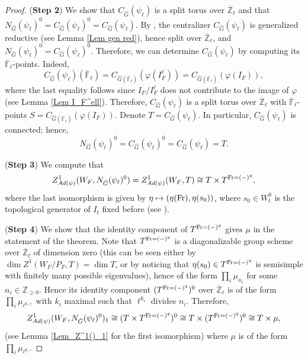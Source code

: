 \begin{theorem}
\begin{proof}
    	(\textbf{Step 2}) We show that $C_{\hat{G}}(\psi_{\ell})$ is a split torus over $\overline{\mathbb{Z}}_{\ell}$ and that $N_{\hat{G}}(\psi_{\ell})^0=C_{\hat{G}}(\psi_{\ell})^0=C_{\hat{G}}(\psi_{\ell})$. By \cite[Subsection 3.1]{dat2022ihes}, the centralizer $C_{\hat{G}}(\psi_{\ell})$ is generalized reductive (see Lemma \ref{Lem gen red}), hence split over $\overline{\mathbb{Z}}_{\ell}$, and $N_{\hat{G}}(\psi_{\ell})^0=C_{\hat{G}}(\psi_{\ell})^0$. Therefore, we can determine $C_{\hat{G}}(\psi_{\ell})$ by computing its $\overline{\mathbb{F}}_{\ell}$-points. Indeed,
    	$$C_{\hat{G}}(\psi_{\ell})(\overline{\mathbb{F}}_{\ell})=C_{\hat{G}(\overline{\mathbb{F}}_{\ell})}(\varphi(I_F^\ell))=C_{\hat{G}(\overline{\mathbb{F}}_{\ell})}(\varphi(I_F)),$$
    	where the last equality follows since $I_F/I_F^{\ell}$ does not contribute to the image of $\varphi$ (see Lemma \ref{Lem I_F^ell}). Therefore, $C_{\hat{G}}(\psi_{\ell})$ is a split torus over $\overline{\mathbb{Z}}_{\ell}$ with $\overline{\mathbb{F}}_{\ell}$-points $S=C_{\hat{G}(\overline{\mathbb{F}}_{\ell})}(\varphi(I_F))$. Denote $T=C_{\hat{G}}(\psi_{\ell})$. In particular, $C_{\hat{G}}(\psi_{\ell})$  is connected; hence, 
    	\begin{equation}\label{Equation: T}
    	N_{\hat{G}}(\psi_{\ell})^0=C_{\hat{G}}(\psi_{\ell})^0=C_{\hat{G}}(\psi_{\ell})=T.
    	\end{equation}
    	
    	
    	(\textbf{Step 3}) We compute that
    	$$Z^1_{Ad(\psi)}(W_F, N_{\hat{G}}(\psi_{\ell})^0)=Z^1_{Ad(\psi)}(W_F, T) \cong T \times T^{\operatorname{Fr}=(-)^q},$$
    	where the last isomorphism is given by $\eta \mapsto (\eta(\operatorname{Fr}), \eta(s_0))$, where $s_0 \in W_t^0$ is the topological generator of $I_t$ fixed before (see \cite[Example 3.14]{dat2022ihes}).
    	
    	(\textbf{Step 4}) We show that the identity component of $T^{\operatorname{Fr}=(-)^q}$ gives $\mu$ in the statement of the theorem. Note that $T^{\operatorname{Fr}=(-)^q}$ is a diagonalizable group scheme over $\overline{\mathbb{Z}}_{\ell}$ of dimension zero (this can be seen either by $\dim Z^1(W_F/P_F, T)=\dim T$, or by noticing that $\eta(s_0) \in T^{\operatorname{Fr}=(-)^q}$ is semisimple with finitely many possible eigenvalues), hence of the form $\prod_i\mu_{n_i}$ for some $n_i \in \mathbb{Z}_{\geq 0}$. Hence its identity component $(T^{\operatorname{Fr}=(-)^q})^0$ over $\overline{\mathbb{Z}}_{\ell}$ is of the form $\prod_i\mu_{\ell^{k_i}},$ with $k_i$ maximal such that $\ell^{k_i}$ divides $n_i$. Therefore, 
    	$$Z^1_{Ad(\psi)}(W_F, N_{\hat{G}}(\psi_{\ell})^0)_1 \cong (T \times T^{\operatorname{Fr}=(-)^q})^0 \cong T \times (T^{\operatorname{Fr}=(-)^q})^0 \cong T \times \mu,$$
    	(see Lemma \ref{Lem_Z^1()_1} for the first isomorphism) where $\mu$ is of the form $\prod_i\mu_{\ell^{k_i}}$.
    	

\end{proof}
\end{theorem}
